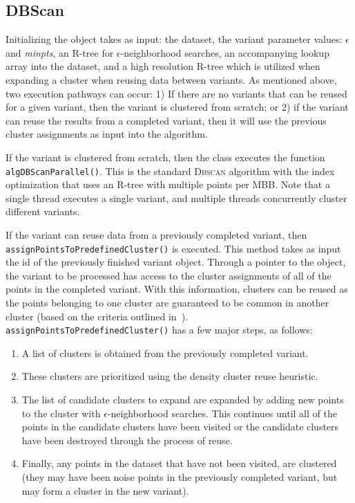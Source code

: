 \documentclass[12pt]{article}
\def\eps{$\epsilon$\xspace}
\def\minpts{\emph{minpts}\xspace}
\def\dbscan{\textsc{Dbscan}\xspace}
\begin{document}
\subsection{DBScan}

Initializing the object takes as input: the dataset, the variant parameter values: \eps and \minpts, an R-tree for \eps-neighborhood searches, an accompanying lookup array into the dataset, and a high resolution R-tree which is utilized when expanding a cluster when reusing data between variants. As mentioned above, two execution pathways can occur: 1) If there are no variants that can be reused for a given variant, then the variant is clustered from scratch; or 2) if the variant can reuse the results from a completed variant, then it will use the previous cluster assignments as input into the algorithm.

If the variant is clustered from scratch, then the class executes the function\\ \texttt{algDBScanParallel()}. This is the standard \dbscan algorithm with the index optimization that uses an R-tree with multiple points per MBB. Note that a single thread executes a single variant, and multiple threads concurrently cluster different variants.

If the variant can reuse data from a previously completed variant, then\\ \texttt{assignPointsToPredefinedCluster()} is executed.  This method takes as input the id of the previously finished variant object. Through a pointer to the object, the variant to be processed has access to the cluster assignments of all of the points in the completed variant. With this information, clusters can be reused as the points belonging to one cluster are guaranteed to be common in another cluster (based on the criteria outlined in~\cite{Gowanlock2016}). \texttt{assignPointsToPredefinedCluster()} has a few major steps, as follows:

\begin{enumerate}
\item A list of clusters is obtained from the previously completed variant.
\item These clusters are prioritized using the density cluster reuse heuristic.
\item The list of candidate clusters to expand are expanded by adding new points to the cluster with \eps-neighborhood searches.  This continues until all of the points in the candidate clusters have been visited or the candidate clusters have been destroyed through the process of reuse.
\item Finally, any points in the dataset that have not been visited, are clustered (they may have been noise points in the previously completed variant, but may form a cluster in the new variant). 
\end{enumerate}
\end{document}
